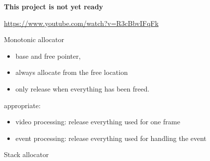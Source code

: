 
\textbf{This project is not yet ready}

\url{https://www.youtube.com/watch?v=R3cBbvIFqFk}

Monotonic allocator
\begin{itemize}
\item base and free pointer,
\item always allocate from the free location
\item only release when everything has been freed.
\end{itemize}

appropriate:
\begin{itemize}
\item video processing: release everything used for one frame
\item event processing: release everything used for handling the event
\end{itemize}

Stack allocator
